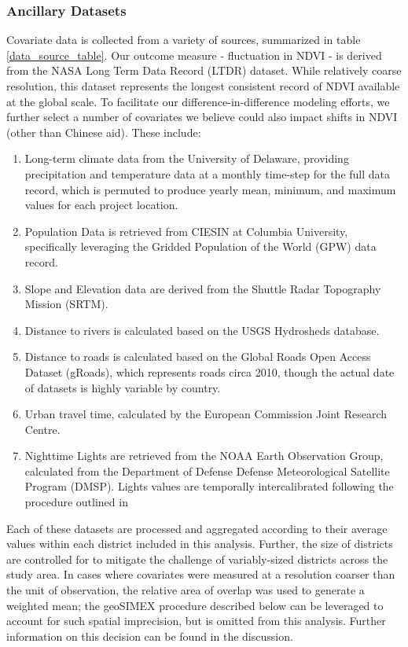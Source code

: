\subsubsection{Ancillary Datasets}
Covariate data is collected from a variety of sources, summarized in table \ref{data_source_table}.
Our outcome measure - fluctuation in NDVI - is derived from the NASA Long Term Data Record (LTDR) dataset.
While relatively coarse resolution, this dataset represents the longest consistent record of NDVI available at the global scale.
To facilitate our difference-in-difference modeling efforts, we further select a number of covariates we believe could also impact shifts in NDVI (other than Chinese aid).
These include:
\begin{enumerate}
\item{Long-term climate data from the University of Delaware, providing precipitation and temperature data at a monthly time-step for the full data record, which is permuted to produce yearly mean, minimum, and maximum values for each project location.}
\item{Population Data is retrieved from CIESIN at Columbia University, specifically leveraging the Gridded Population of the World (GPW) data record.}
\item{Slope and Elevation data are derived from the Shuttle Radar Topography Mission (SRTM).}
\item{Distance to rivers is calculated based on the USGS Hydrosheds database.}
\item{Distance to roads is calculated based on the Global Roads Open Access Dataset (gRoads), which represents roads circa 2010, though the actual date of datasets is highly variable by country.}
\item{Urban travel time, calculated by the European Commission Joint Research Centre.}
\item{Nighttime Lights are retrieved from the NOAA Earth Observation Group, calculated from the Department of Defense Defense Meteorological Satellite Program (DMSP).  Lights values are temporally intercalibrated following the procedure outlined in \cite{weng_global_2014}}
\end{enumerate}
Each of these datasets are processed and aggregated according to their average values within each district included in this analysis.  
Further, the size of districts are controlled for to mitigate the challenge of variably-sized districts across the study area.
In cases where covariates were measured at a resolution coarser than the unit of observation, the relative area of overlap was used to generate a weighted mean; the geoSIMEX procedure described below can be leveraged to account for such spatial imprecision, but is omitted from this analysis.
Further information on this decision can be found in the discussion.

